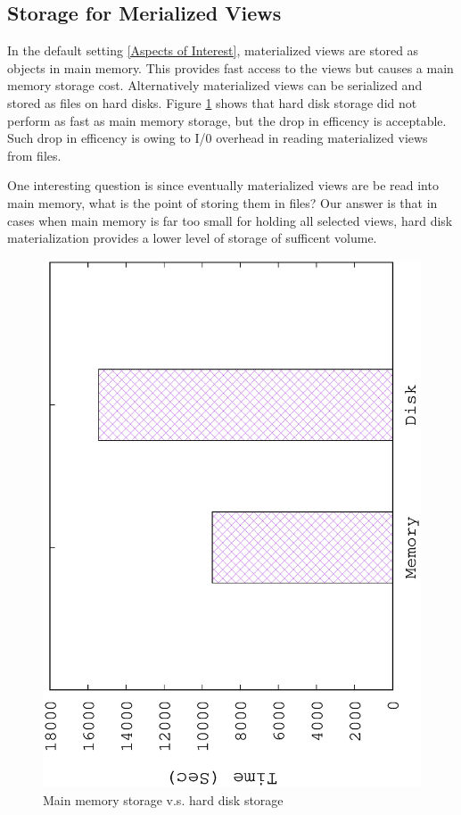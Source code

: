 \subsection{Storage for Merialized Views}
In the default setting \ref{Aspects of Interest}, materialized views are stored as objects in main memory. This provides fast access to the views but causes a main memory storage cost. Alternatively materialized views can be serialized and stored as files on hard disks. Figure \ref{fig:disk} shows that hard disk storage did not perform as fast as main memory storage, but the drop in efficency is acceptable. Such drop in efficency is owing to I/0 overhead in reading materialized views from files.

 One interesting question is since eventually materialized views are be read into main memory, what is the point of storing them in files? Our answer is that in cases when main memory is far too small for holding all selected views, hard disk materialization provides a lower level of storage of sufficent volume.
 
\begin{figure}[H]
	\centering
	\includegraphics[scale=0.5, angle=270]{plot/disk}
	\caption{Main memory storage v.s. hard disk storage}
	\label{fig:disk}
\end{figure}

